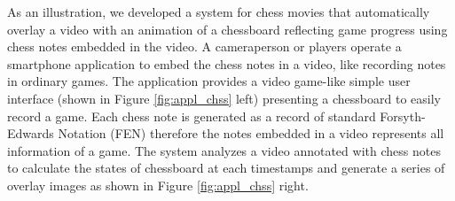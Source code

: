 As an illustration, we developed a system for chess movies that automatically overlay a video with an animation of a chessboard reflecting game progress using chess notes embedded in the video.
A cameraperson or players operate a smartphone application to embed the chess notes in a video, like recording notes in ordinary games.
The application provides a video game-like simple user interface (shown in Figure \ref{fig:appl_chss} left) presenting a chessboard to easily record a game.
Each chess note is generated as a record of standard Forsyth-Edwards Notation (FEN) therefore the notes embedded in a video represents all information of a game.
The system analyzes a video annotated with chess notes to calculate the states of chessboard at each timestamps and generate a series of overlay images as shown in Figure \ref{fig:appl_chss} right.
